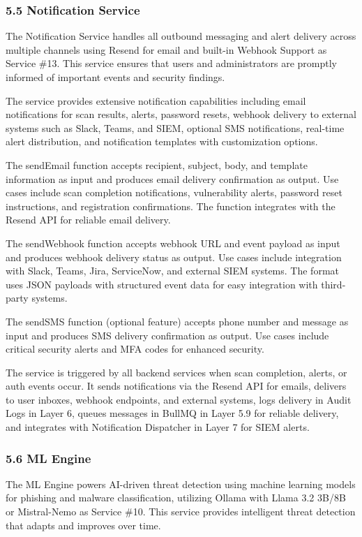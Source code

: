 \documentclass[12pt,a4paper]{report}
\begin{document}
\subsubsection{5.5 Notification Service}

The Notification Service handles all outbound messaging and alert delivery across multiple channels using Resend for email and built-in Webhook Support as Service \#13. This service ensures that users and administrators are promptly informed of important events and security findings.

The service provides extensive notification capabilities including email notifications for scan results, alerts, password resets, webhook delivery to external systems such as Slack, Teams, and SIEM, optional SMS notifications, real-time alert distribution, and notification templates with customization options.

The sendEmail function accepts recipient, subject, body, and template information as input and produces email delivery confirmation as output. Use cases include scan completion notifications, vulnerability alerts, password reset instructions, and registration confirmations. The function integrates with the Resend API for reliable email delivery.

The sendWebhook function accepts webhook URL and event payload as input and produces webhook delivery status as output. Use cases include integration with Slack, Teams, Jira, ServiceNow, and external SIEM systems. The format uses JSON payloads with structured event data for easy integration with third-party systems.

The sendSMS function (optional feature) accepts phone number and message as input and produces SMS delivery confirmation as output. Use cases include critical security alerts and MFA codes for enhanced security.

The service is triggered by all backend services when scan completion, alerts, or auth events occur. It sends notifications via the Resend API for emails, delivers to user inboxes, webhook endpoints, and external systems, logs delivery in Audit Logs in Layer 6, queues messages in BullMQ in Layer 5.9 for reliable delivery, and integrates with Notification Dispatcher in Layer 7 for SIEM alerts.

\subsubsection{5.6 ML Engine}

The ML Engine powers AI-driven threat detection using machine learning models for phishing and malware classification, utilizing Ollama with Llama 3.2 3B/8B or Mistral-Nemo as Service \#10. This service provides intelligent threat detection that adapts and improves over time.
\end{document}
